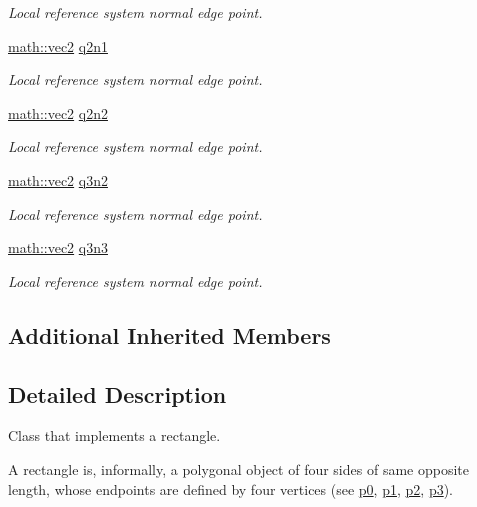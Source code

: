 \begin{DoxyCompactItemize}
\begin{DoxyCompactList}\small\item\em Local reference system normal edge point. \end{DoxyCompactList}\item 
\hyperlink{structphysim_1_1math_1_1vec2}{math\+::vec2} \hyperlink{classphysim_1_1geometric_1_1rectangle_a994047209dfbadc22c7c535d98bacb6e}{q2n1}
\begin{DoxyCompactList}\small\item\em Local reference system normal edge point. \end{DoxyCompactList}\item 
\hyperlink{structphysim_1_1math_1_1vec2}{math\+::vec2} \hyperlink{classphysim_1_1geometric_1_1rectangle_a6a9e2d8b48e7eccedbaf2f535e66684c}{q2n2}
\begin{DoxyCompactList}\small\item\em Local reference system normal edge point. \end{DoxyCompactList}\item 
\hyperlink{structphysim_1_1math_1_1vec2}{math\+::vec2} \hyperlink{classphysim_1_1geometric_1_1rectangle_abf958a45fc218ab2c4cdfeff4379c27b}{q3n2}
\begin{DoxyCompactList}\small\item\em Local reference system normal edge point. \end{DoxyCompactList}\item 
\hyperlink{structphysim_1_1math_1_1vec2}{math\+::vec2} \hyperlink{classphysim_1_1geometric_1_1rectangle_aad7fd35f2fb7964dff1acd1463597139}{q3n3}
\begin{DoxyCompactList}\small\item\em Local reference system normal edge point. \end{DoxyCompactList}\end{DoxyCompactItemize}
\subsection*{Additional Inherited Members}


\subsection{Detailed Description}
Class that implements a rectangle. 

A rectangle is, informally, a polygonal object of four sides of same opposite length, whose endpoints are defined by four vertices (see \hyperlink{classphysim_1_1geometric_1_1rectangle_a54ec5f5baaa4cbe0549de696334e46f4}{p0}, \hyperlink{classphysim_1_1geometric_1_1rectangle_a7af5009a87211214b1b1ef7ec6316d20}{p1}, \hyperlink{classphysim_1_1geometric_1_1rectangle_ab3107a5faeb3c52420ffe4c074a145be}{p2}, \hyperlink{classphysim_1_1geometric_1_1rectangle_a559ad6301b4da2b82350d36cdfa46f23}{p3}).

